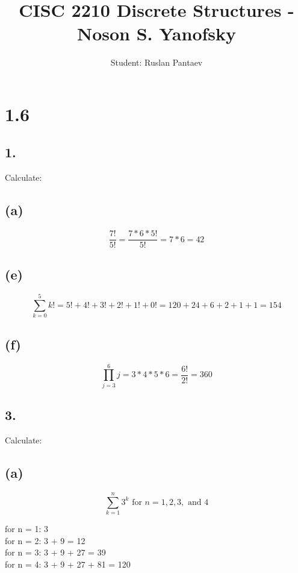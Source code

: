 \documentclass[11pt]{article}
\begin{document}
\title{CISC 2210 Discrete Structures - Noson S. Yanofsky}
\author{Student: Ruslan Pantaev}
\maketitle


\section*{1.6}
%
%
\subsection*{1.}
\begin{center}
Calculate:
\end{center}

\subsection*{(a)}
$$\frac{7!}{5!} = \frac{7 * 6 * 5!}{5!} = 7 * 6 = 42$$

\subsection*{(e)}
$$\sum_{k=0}^{5} k! = 5! + 4! + 3! + 2! + 1! + 0! = 120 + 24 + 6 + 2 + 1 + 1 = 154$$

\subsection*{(f)}
$$\prod_{j=3}^{6} j = 3*4*5*6 = \frac{6!}{2!} = 360$$
%
%
\subsection*{3.}
\begin{center}
Calculate:
\end{center}

\subsection*{(a)}
$$\sum_{k=1}^{n} 3^{k} \text{ for } n = 1,2,3, \text{ and } 4$$
\begin{center}
for n = 1: 3\\
for n = 2: 3 + 9 = 12\\
for n = 3: 3 + 9 + 27 = 39\\
for n = 4: 3 + 9 + 27 + 81 = 120\\
\end{center}
\end{document}
